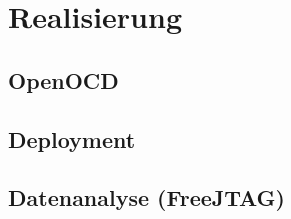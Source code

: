 \chapter{Realisierung}
\section{OpenOCD}
\section{Deployment}
\section{Datenanalyse (FreeJTAG)}

\lipsum